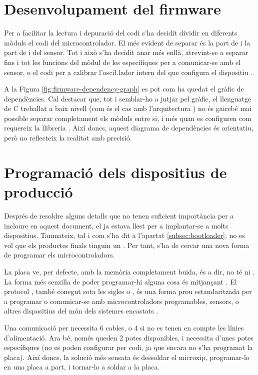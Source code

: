 \section{Desenvolupament del firmware}

Per a facilitar la lectura i depuració del codi s'ha decidit dividir en
diferents mòduls el codi del microcontrolador. El més evident de separar és
la part de  i la part de  i del sensor. Tot i això s'ha
decidit anar més enllà, atrevint-se a separar fins i tot les funcions del mòdul
 de les específiques per a comunicar-se amb el sensor, o el codi per
a calibrar l'osci\l.lador intern del que configura el dispositiu . 

A la Figura \ref{fig:firmware-dependency-graph} es pot com ha quedat el gràfic
de dependències. Cal destacar que, tot i semblar-ho a jutjar pel gràfic, el
llenguatge de C treballat a baix nivell (com és el cas amb l'arquitectura
) no és gairebé mai possible separar completament els mòduls entre
si, i més quan es configuren com requereix la llibreria . Així
doncs, aquest diagrama de dependències és orientatiu, però no reflecteix la
realitat amb precisió.



\section{Programació dels dispositius de producció}

Després de resoldre alguns detalls que no tenen suficient importància per a
incloure en aquest document, el  ja estava llest per a 
implantar-se a molts dispositius. Tanmateix, tal i com s'ha dit a
l'apartat \ref{subsec:bootloader}, no es vol que els productes finals tinguin
un . Per tant, s'ha de cercar una nova forma de programar
els microcontroladors.

La placa  ve, per defecte, amb la memòria  completament
buida, és a dir, no té ni . La forma més senzilla de poder
programar-hi alguna cosa és mitjançant . El protocol
, també conegut sota les sigles  o
, és una forma prou estandaritzada per a
programar o comunicar-se amb microcontroladors programables, sensors, o altres
dispositius del món dels sistemes encastats \cite{Isp}.

Una comunicació per  necessita 6 cables, o 4 si no es tenen en compte
les línies d'alimentació. Ara bé, només queden 2 potes disponibles, i 
necessita d'unes potes específiques (no es poden configurar per codi, ja que
encara no s'ha programat la placa). Així doncs, la solució més sensata és
dessoldar el microxip, programar-lo en una placa a part, i tornar-lo a soldar
a la placa.

